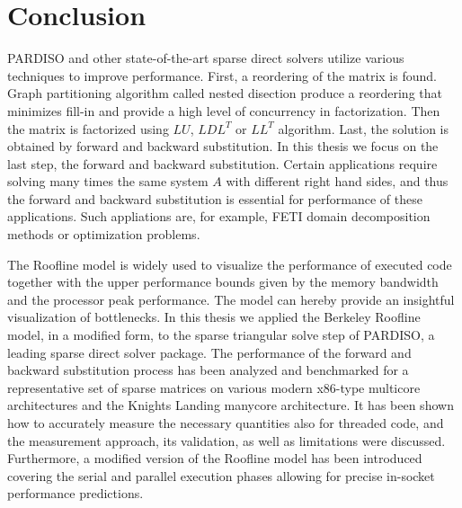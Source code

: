 \chapter{Conclusion}
\label{sec:conclusion}

PARDISO and other state-of-the-art sparse direct solvers utilize various techniques to improve performance. First, a reordering of the matrix is found. Graph partitioning algorithm called nested disection produce a reordering that minimizes fill-in and provide a high level of concurrency in factorization. Then the matrix is factorized using $LU$, $LDL^T$ or $LL^T$ algorithm. Last, the solution is obtained by forward and backward substitution. In this thesis we focus on the last step, the forward and backward substitution. Certain applications require solving many times the same system $A$ with different right hand sides, and thus the forward and backward substitution is essential for performance of these applications. Such appliations are, for example, FETI domain decomposition methods or optimization problems.

The Roofline model is widely used to visualize the performance of executed code together with the upper performance bounds given by the memory bandwidth and the processor peak performance. The model can hereby provide an insightful visualization of bottlenecks. In this thesis we applied the Berkeley Roofline model, in a modified form, to the sparse triangular solve step of PARDISO, a leading sparse direct solver package. The performance of the forward and backward substitution process has been analyzed and benchmarked for a representative set of sparse matrices on various modern x86-type multicore architectures and the Knights Landing manycore architecture. It has been shown how to accurately measure the necessary quantities also for threaded code, and the measurement approach, its validation, as well as limitations were discussed. Furthermore, a modified version of the Roofline model has been introduced covering the serial and parallel execution phases allowing for precise in-socket performance predictions.

